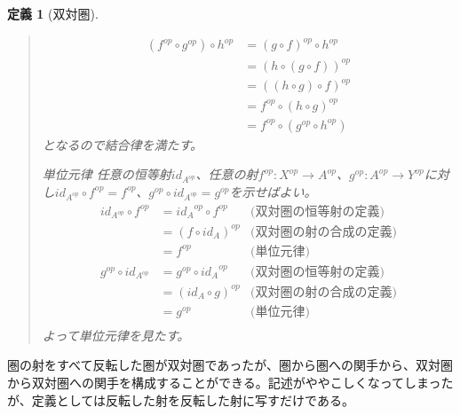 \documentclass[uplatex,dvipdfmx]{jsarticle}
\newcommand{\arrow}{\rightarrow}
\newcommand{\mor}[3]{#1:#2\arrow #3}
\newtheorem{define}[proof]{定義}
\numberwithin{proof}{subsection}
\newenvironment{mydescription}
{\begin{description}
  \setlength{\parskip}{0.5cm}
}
{\end{description}}
\begin{document}
\begin{define}[双対圏]
\begin{quote}
\begin{mydescription}
				\begin{align*}
					(f^{op}\circ g^{op})\circ h^{op}&=(g\circ f)^{op}\circ h^{op}\\
					&=(h\circ(g\circ f))^{op}\\
					&=((h\circ g)\circ f)^{op}\\
					&=f^{op}\circ (h\circ g)^{op}\\
					&=f^{op}\circ (g^{op}\circ h^{op})
				\end{align*}
				となるので結合律を満たす。
				\item[単位元律]任意の恒等射$id_{A^{op}}$、任意の射$\mor{f^{op}}{X^{op}}{A^{op}}$、$\mor{g^{op}}{A^{op}}{Y^{op}}$に対し$id_{A^{op}}\circ f^{op}=f^{op}$、$g^{op}\circ id_{A^{op}}=g^{op}$を示せばよい。
				\begin{align*}
					id_{A^{op}}\circ f^{op}&={id_A}^{op}\circ f^{op}&\text{(双対圏の恒等射の定義)}\\
					&=(f\circ id_A)^{op}&\text{(双対圏の射の合成の定義)}\\
					&=f^{op}&\text{(単位元律)}\\
					g^{op}\circ id_{A^{op}}&=g^{op}\circ {id_A}^{op}&\text{(双対圏の恒等射の定義)}\\
					&=(id_A\circ g)^{op}&\text{(双対圏の射の合成の定義)}\\
					&=g^{op}&\text{(単位元律)}\\
				\end{align*}
				よって単位元律を見たす。
			\end{mydescription}
		\end{quote}
	\end{define}
	圏の射をすべて反転した圏が双対圏であったが、圏から圏への関手から、双対圏から双対圏への関手を構成することができる。記述がややこしくなってしまったが、定義としては反転した射を反転した射に写すだけである。
\end{document}
